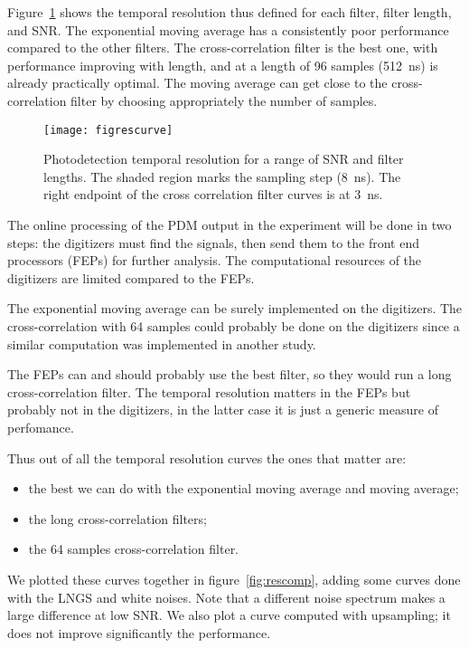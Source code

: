 Figure~\ref{fig:rescurve} shows the temporal resolution thus defined for each
filter, filter length, and SNR. The exponential moving average has a
consistently poor performance compared to the other filters. The
cross-correlation filter is the best one, with performance improving with
length, and at a length of 96 samples (\SI{512}{ns}) is already practically
optimal. The moving average can get close to the cross-correlation filter by
choosing appropriately the number of samples.

\begin{figure}
    \hspace{-0.09\textwidth}
    \texttt{[image: figrescurve]}
    
    \caption{Photodetection temporal resolution for a range of SNR and filter
    lengths. The shaded region marks the sampling step (\SI{8}{ns}). The right
    endpoint of the cross correlation filter curves is at \SI{3}{ns}.}
    
    \label{fig:rescurve}
\end{figure}

The online processing of the PDM output in the experiment will be done in two
steps: the digitizers must find the signals, then send them to the front end
processors (FEPs) for further analysis. The computational resources of the
digitizers are limited compared to the FEPs.


The exponential moving average can be surely implemented on the digitizers. The
cross-correlation with 64 samples could probably be done on the digitizers
since a similar computation was implemented in another study.

The FEPs can and should probably use the best filter, so they would run a long
cross-correlation filter. The temporal resolution matters in the FEPs but
probably not in the digitizers, in the latter case it is just a generic measure
of perfomance.

Thus out of all the temporal resolution curves the ones that matter are:
%
\begin{itemize}
    \item the best we can do with the exponential moving average and moving
    average;
    \item the long cross-correlation filters;
    \item the 64 samples cross-correlation filter.
\end{itemize}
%
We plotted these curves together in figure~\ref{fig:rescomp}, adding some
curves done with the LNGS and white noises. Note that a different noise
spectrum makes a large difference at low SNR. We also plot a curve computed
with upsampling; it does not improve significantly the performance.

